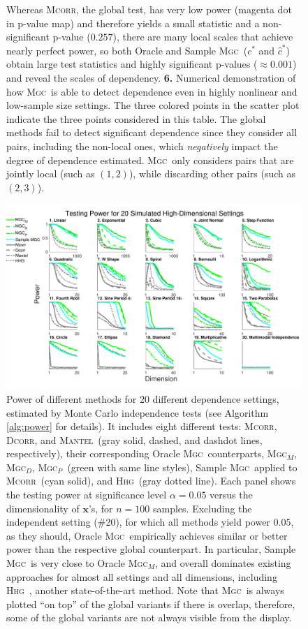 \documentclass[11pt]{article}
\providecommand{\sct}[1]{{\normalfont\textsc{#1}}}
\providecommand{\mb}[1]{\boldsymbol{#1}}
\newcommand{\GG}{c}
\newcommand{\Mgc}{\sct{Mgc}}
\newcommand{\Mgcp}{\sct{Mgc$_P$}}
\newcommand{\Mgcd}{\sct{Mgc$_D$}}
\newcommand{\Mgcm}{\sct{Mgc$_M$}}
\newcommand{\Hhg}{\sct{Hhg}}
\newcommand{\Dcorr}{\sct{Dcorr}}
\newcommand{\Mcorr}{\sct{Mcorr}}
\newcommand{\Mantel}{\sct{Mantel}}
\begin{document}
\begin{figure}[htbp]
{Whereas \Mcorr, the global test, has very low power (magenta dot in  p-value map) and therefore yields a small statistic and a non-significant p-value ($0.257$),  there are many local scales that achieve nearly perfect power, so both Oracle and Sample \Mgc~($\GG^{*}$ and $\hat{\GG}^{*}$) obtain large test statistics and highly significant p-values ($\approx 0.001$) and reveal the scales of dependency. 
\textbf{6.} Numerical demonstration of how \Mgc~is able to detect dependence even in highly nonlinear and low-sample size settings. The three colored points in the scatter plot indicate the three points considered in this table. 
The global methods fail to detect significant dependence since they consider all pairs, including the non-local ones, which \emph{negatively} impact the degree of dependence estimated.
\Mgc~only considers pairs that are jointly local (such as $(1,2)$), while discarding other pairs (such as $(2,3)$). 
}
\label{f:schematic}
\end{figure}

\begin{figure}[htbp]
\includegraphics[width=1.0\textwidth,trim={0 0.5cm 4cm 0},clip]{Figures/FigHDPowerAll}
\caption{Power of different methods for $20$ different dependence settings, estimated by Monte Carlo independence tests (see Algorithm \ref{alg:power} for details). It includes eight different tests: \Mcorr, \Dcorr, and \Mantel~(gray solid, dashed, and dashdot lines, respectively), their corresponding Oracle \Mgc~counterparts, \Mgcm, \Mgcd, \Mgcp~(green with same line styles), Sample \Mgc~applied to \Mcorr~(cyan solid), and \Hhg~(gray dotted line). 
Each panel shows the testing power at significance level $\alpha=0.05$ versus the dimensionality of $\mb{x}$'s, for $n=100$ samples. 
Excluding the independent setting (\#20), for which all methods yield power $0.05$, as they should, Oracle \Mgc~empirically achieves similar or better power than the respective global counterpart. In particular, Sample \Mgc~is very close to Oracle \Mgcm, and overall dominates existing approaches for almost all settings and all dimensions, including \Hhg~\cite{HellerGorfine2013}, another state-of-the-art method. Note that \Mgc~is always plotted ``on top'' of the global variants if there is overlap, therefore, some of the global variants are not always visible from the display.}
\label{f:nDAll}
\end{figure}
\end{document}
